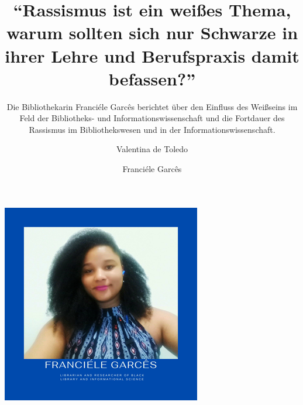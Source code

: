 \documentclass[a4paper,
fontsize=11pt,
oneside,
numbers=noperiodatend,
parskip=half-,
bibliography=totoc,
final
]{scrartcl}
\title{\LARGE{\enquote{Rassismus ist ein weißes Thema, warum sollten sich nur Schwarze in ihrer Lehre und Berufspraxis damit befassen?}}}%
\subtitle{Die Bibliothekarin Franciéle Garcês berichtet über den Einfluss des Weißseins im Feld der Bibliotheks- und Informationswissenschaft und die Fortdauer des Rassismus im Bibliothekswesen und in der Informationswissenschaft.}%
\author{Valentina de Toledo \and Franciéle Garcês} %
\date{}
\begin{document}
\maketitle
\thispagestyle{fancyplain} 


\begin{center}
\includegraphics{img/img1.PNG}
\end{center}
\end{document}
